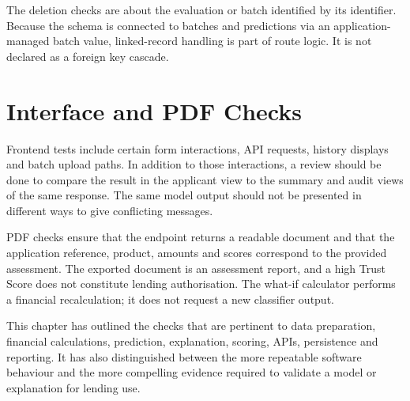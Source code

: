 The deletion checks are about the evaluation or batch identified by its identifier. Because the schema is connected to batches and predictions via an application-managed batch value, linked-record handling is part of route logic. It is not declared as a foreign key cascade.

\section{Interface and PDF Checks}
Frontend tests include certain form interactions, API requests, history displays and batch upload paths. In addition to those interactions, a review should be done to compare the result in the applicant view to the summary and audit views of the same response. The same model output should not be presented in different ways to give conflicting messages.

PDF checks ensure that the endpoint returns a readable document and that the application reference, product, amounts and scores correspond to the provided assessment. The exported document is an assessment report, and a high Trust Score does not constitute lending authorisation. The what-if calculator performs a financial recalculation; it does not request a new classifier output.

\par\medskip\noindent
This chapter has outlined the checks that are pertinent to data preparation, financial calculations, prediction, explanation, scoring, APIs, persistence and reporting. It has also distinguished between the more repeatable software behaviour and the more compelling evidence required to validate a model or explanation for lending use.
